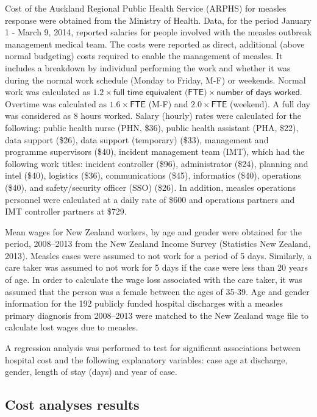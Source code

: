 \documentclass{article}
\begin{document}
Cost of the Auckland Regional Public Health Service (ARPHS) for measles response were obtained from the Ministry of Health. Data, for the period January 1 - March 9, 2014, reported salaries for people involved with the measles outbreak management medical team. The costs were reported as direct, additional (above normal budgeting) costs required to enable the management of measles. It includes a breakdown by individual performing the work and whether it was during the normal work schedule (Monday to Friday, M-F) or weekends. Normal work was calculated as $1.2 \times \textsf{full time equivalent (FTE)} \times \textsf{number of days worked}$. Overtime was calculated as $1.6\times\textsf{FTE}$ (M-F) and $2.0 \times \textsf{FTE}$ (weekend). A full day was considered as 8 hours worked. Salary (hourly) rates were calculated for the following: public health nurse (PHN, \$36), public health assistant (PHA, \$22), data support (\$26), data support (temporary) (\$33), management and programme supervisors (\$40), incident management team (IMT), which had the following work titles: incident controller (\$96), administrator (\$24), planning and intel (\$40), logistics (\$36), communications (\$45), informatics (\$40), operations (\$40), and safety/security officer (SSO) (\$26). In addition, measles operations personnel were calculated at a daily rate of \$600 and operations partners and IMT controller partners at \$729.

Mean wages for New Zealand workers, by age and gender were obtained for the period, 2008--2013 from the New Zealand Income Survey (Statistics New Zealand, 2013). Measles cases were assumed to not work for a period of 5 days. Similarly, a care taker was assumed to not work for 5 days if the case were less than 20 years of age. In order to calculate the wage loss associated with the care taker, it was assumed that the person was a female between the ages of 35-39. Age and gender information for the 192 publicly funded hospital discharges with a measles primary diagnosis from 2008--2013 were matched to the New Zealand wage file to calculate lost wages due to measles.

A regression analysis was performed to test for significant associations between hospital cost and the following explanatory variables: case age at discharge, gender, length of stay (days) and year of case.

\subsection{Cost analyses results}
\label{sub:cost_benefit}
\end{document}
